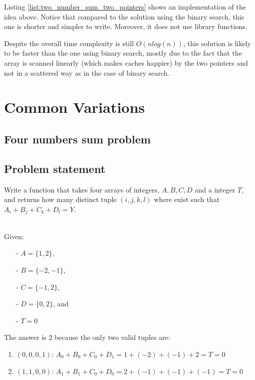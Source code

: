 Listing \ref{list:two_number_sum_two_pointers} shows an implementation of the idea above. Notice that compared to the solution using the binary search, this one is shorter and simpler to write. Moreover, it does not use library functions. 



Despite the overall time complexity is still $O(n log(n))$, this solution is likely to be faster than
the one using binary search, mostly due to the fact that the array is scanned linearly (which makes caches happier) by the two pointers and not in a scattered way as in the case of binary search.

\section{Common Variations}
\subsection{Four numbers sum problem}
\label{sec:four_number}

\subsection{Problem statement}

\begin{exercise}
Write a function that takes four arrays of integers, $A,B,C,D$ and a integer $T$,
and returns how many distinct tuple $(i,j,k,l)$ where exist such that $A_i+B_j+C_k+D_l = Y$.

\begin{example}
\hfill \\
Given:
	\begin{itemize}
		\item[-] 	$A=\{1,2\}$,
		\item[-] 	$B=\{-2,-1\}$,
		\item[-] 	$C=\{-1,2\}$,
		\item[-]	$D=\{0,2\}$, and 
		\item[-] 	$T = 0$
	\end{itemize}
The answer is $2$ because the only two valid tuples are:
\begin{enumerate}
	\item $(0,0,0,1)$: $A_0 + B_0 + C_0 + D_1 = 1 + (-2) + (-1) + 2 = T = 0$
	\item $(1,1,0,0)$: $A_1 + B_1 + C_0 + D_0 = 2 + (-1) + (-1) + (-1) = T = 0$
\end{enumerate}
\end{example}
\end{exercise}

